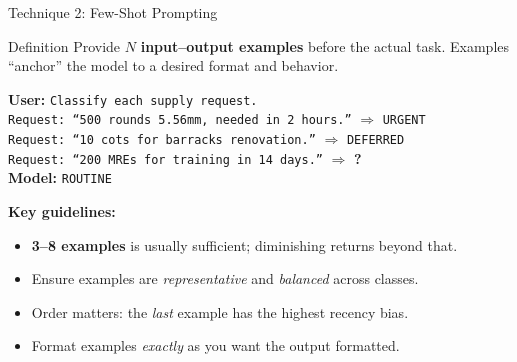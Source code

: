 \documentclass{beamer}
\begin{document}
\begin{frame}{Technique 2: Few-Shot Prompting}
    \begin{block}{Definition}
        Provide $N$ \textbf{input--output examples} before the actual task.
        Examples ``anchor'' the model to a desired format and behavior.
    \end{block}

    \vspace{0.1cm}
    \begin{tcolorbox}[colback=backcolour, colframe=gray!50, title={\small Example (2-shot)}]
        \scriptsize
        \textbf{User:} \texttt{Classify each supply request.}\\[2pt]
        \texttt{Request: ``500 rounds 5.56mm, needed in 2 hours.''} $\Rightarrow$ \texttt{URGENT}\\
        \texttt{Request: ``10 cots for barracks renovation.''} $\Rightarrow$ \texttt{DEFERRED}\\
        \texttt{Request: ``200 MREs for training in 14 days.''} $\Rightarrow$ \textbf{?}\\[2pt]
        \textbf{Model:} \texttt{ROUTINE}
    \end{tcolorbox}

    \vspace{0.1cm}
    \textbf{Key guidelines:}
    \begin{itemize}
        \item \textbf{3--8 examples} is usually sufficient; diminishing returns beyond that.
        \item Ensure examples are \emph{representative} and \emph{balanced} across classes.
        \item Order matters: the \emph{last} example has the highest recency bias.
        \item Format examples \emph{exactly} as you want the output formatted.
    \end{itemize}
\end{frame}
\end{document}
